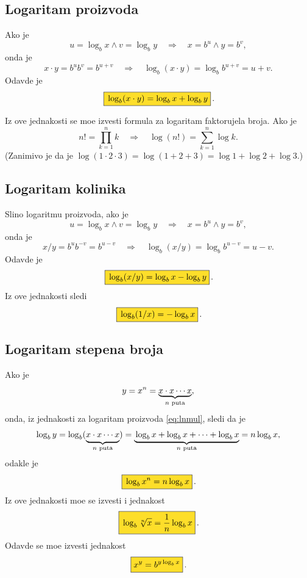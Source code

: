 \documentclass[12pt, twoside, a4paper]{article}
\def\logb{\log_b}
\def\okvir#1{\,\fcolorbox{black}{Goldenrod}{$\displaystyle{\mathstrut #1}$}\,}
\def\sledi{{\quad\Rightarrow\quad}}
\begin{document}
\subsection{Logaritam proizvoda}

Ako je
$$
u=\logb x\land v=\log_b y \sledi x=b^u\land y=b^v,
$$
onda je
$$
x\cdot y=b^ub^v=b^{u+v}\sledi \logb(x\cdot y)=\logb b^{u+v}=u+v.
$$
Odavde je
\begin{equation}
\okvir{\logb(x\cdot y)=\logb x+\logb y}.
\label{eq:lnmul}
\end{equation}

Iz ove jednakosti se mo{\zv}e izvesti formula za logaritam faktorujela broja. Ako je
$$
n!=\prod_{k=1}^n k\sledi \log(n!)=\sum_{k=1}^n\log k.
$$
(Zanim{\lj}ivo je da je $\log(1\cdot2\cdot3)=\log(1+2+3)=\log1+\log2+\log3$.)


\subsection{Logaritam koli{\cv}nika}

Sli{\cv}no logaritmu proizvoda, 
ako je
$$
u=\logb x\land v=\log_b y \sledi x=b^u\land y=b^v,
$$
onda je
$$
x/ y=b^ub^{-v}=b^{u-v}\sledi \logb(x/y)=\logb b^{u-v}=u-v.
$$
Odavde je
\begin{equation}
\okvir{\logb(x/ y)=\logb x-\logb y}.
\label{eq:lndiv}
\end{equation}
Iz ove jednakosti sledi
\begin{equation}
\okvir{\logb(1/x)=-\logb x}.
\label{eq:recip}
\end{equation}

\subsection{Logaritam stepena broja}

Ako je
$$
y=x^n=\underbrace{x\cdot x\cdots x}_{\text{$\mathstrut n$ puta}},
$$
onda, iz jednakosti za logaritam proizvoda \eqref{eq:lnmul}, sledi da je
$$
\logb y=\logb (\underbrace{\mathstrut x\cdot x\cdots x}_{\text{$n$ puta}})
=\underbrace{\mathstrut \logb x+\logb x+\cdots+\logb x}_{\text{$n$ puta}}
=n\logb x,
$$
odakle je
\begin{equation}
\okvir{\logb x^n=n\logb x}.
\label{eq:bpow}
\end{equation}
Iz ove jednakosti mo{\zv}e se izvesti i jednakost
\begin{equation}
\okvir{\logb\sqrt[n] x={1\over n}\logb x}.
\label{eq:lnroot}
\end{equation}
Odavde se mo{\zv}e izvesti jednakost
\begin{equation}
\okvir{x^y=b^{y\logb x}}.
\label{eq:power}
\end{equation}
\end{document}
